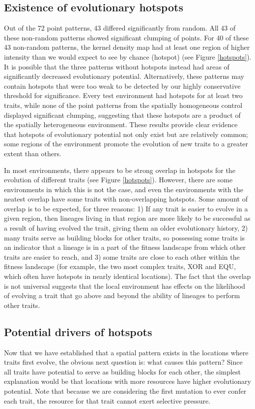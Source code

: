 \documentclass[letterpaper]{article}
\begin{document}
\subsection{Existence of evolutionary hotspots}
Out of the 72 point patterns, 43 differed significantly from random. All 43 of these non-random patterns showed significant clumping of points. For 40 of these 43 non-random patterns, the kernel density map had at least one region of higher intensity than we would expect to see by chance (hotspot) (see Figure \ref{hotspots}). It is possible that the three patterns without hotspots instead had areas of significantly decreased evolutionary potential. Alternatively, these patterns may contain hotspots that were too weak to be detected by our highly conservative threshold for significance. Every test environment had hotspots for at least two traits, while none of the point patterns from the spatially homogeneous control displayed significant clumping, suggesting that these hotspots are a product of the spatially heterogeneous environment. These results provide clear evidence that hotspots of evolutionary potential not only exist but are relatively common; some regions of the environment promote the evolution of new traits to a greater extent than others.

In most environments, there appears to be strong overlap in hotspots for the evolution of different traits (see Figure \ref{hotspots}). However, there are some environments in which this is not the case, and even the environments with the neatest overlap have some traits with non-overlapping hotspots. Some amount of overlap is to be expected, for three reasons: 1) If any trait is easier to evolve in a given region, then lineages living in that region are more likely to be successful as a result of having evolved the trait, giving them an older evolutionary history, 2) many traits serve as building blocks for other traits, so possessing some traits is an indicator that a lineage is in a part of the fitness landscape from which other traits are easier to reach, and 3) some traits are close to each other within the fitness landscape (for example, the two most complex traits, XOR and EQU, which often have hotspots in nearly identical locations). The fact that the overlap is not universal suggests that the local environment has effects on the likelihood of evolving a trait that go above and beyond the ability of lineages to perform other traits.  

\subsection{Potential drivers of hotspots}
Now that we have established that a spatial pattern exists in the locations where traits first evolve, the obvious next question is: what causes this pattern? Since all traits have potential to serve as building blocks for each other, the simplest explanation would be that locations with more resources have higher evolutionary potential. Note that because we are considering the first mutation to ever confer each trait, the resource for that trait cannot exert selective pressure.
\end{document}
